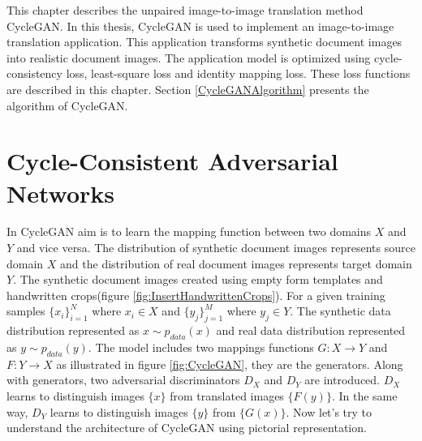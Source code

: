 This chapter describes the unpaired image-to-image translation method \ac{CycleGAN}. In this thesis, \ac{CycleGAN} is used to implement an image-to-image translation application. This application transforms synthetic document images into realistic document images. The application model is optimized using cycle-consistency loss, least-square loss and identity mapping loss. These loss functions are described in this chapter. Section \ref{CycleGANAlgorithm} presents the algorithm of \ac{CycleGAN}.

\section{Cycle-Consistent Adversarial Networks}\label{CycleConsistentAdversarialNetworks}


In \ac{CycleGAN} aim is to learn the mapping function between two domains $X$ and $Y$ and vice versa. The distribution of synthetic document images represents source domain $X$ and the distribution of real document images represents target domain $Y$.  The synthetic document images created using empty form templates and handwritten crops(figure \ref{fig:InsertHandwrittenCrops}). For a given training samples $\{x_i\}_{i=1}^{N}$ where $x_i \in X$ and $\{y_j\}_{j=1}^{M}$ where $y_j \in Y$. The synthetic data distribution represented as $x \sim p_{data}(x)$ and real data distribution represented as $y \sim p_{data}(y)$. The model includes two mappings functions $G : X \rightarrow Y$ and $F : Y \rightarrow X$ as illustrated in figure \ref{fig:CycleGAN}, they are the generators. Along with generators, two adversarial discriminators $D_X$ and $D_Y$ are introduced. $D_X$ learns to distinguish images $\{x\}$ from translated images $\{F(y)\}$. In the same way, $D_Y$ learns to distinguish images $\{y\}$ from $\{G(x)\}$. Now let's try to understand the architecture of \ac{CycleGAN} using pictorial representation.

